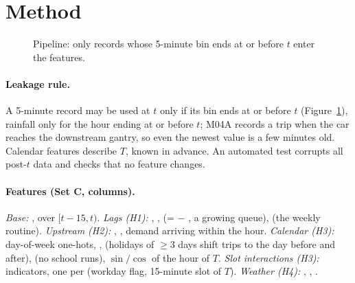 \section{Method}
\begin{figure}[t]\centering\small
{}
\caption{Pipeline: only records whose 5-minute bin ends at or before $t$ enter the features.}\label{fig:pipeline}
\end{figure}

\paragraph{Leakage rule.} A 5-minute record may be used at $t$ only if its bin ends at or before
$t$ (Figure~\ref{fig:pipeline}), rainfall only for the hour ending at or before $t$; M04A records a trip when the car reaches
the downstream gantry, so even the newest value is a few minutes old. Calendar features describe
$T$, known in advance. An automated test corrupts all post-$t$ data and checks that no feature
changes.

\paragraph{Features (Set C,  columns).} \emph{Base:} ,
 over $[t{-}15,t)$. \emph{Lags (H1):} , ,
 (=  $-$ , a growing queue), 
(the weekly routine). \emph{Upstream (H2):} , , demand
arriving within the hour. \emph{Calendar (H3):} day-of-week one-hots, ,
 (holidays of $\geq 3$ days shift trips to the day before and after),
 (no school runs), $\sin/\cos$ of the hour of $T$. \emph{Slot interactions
(H3):}  indicators, one per (workday flag, 15-minute slot of $T$). \emph{Weather
(H4):} , , .

